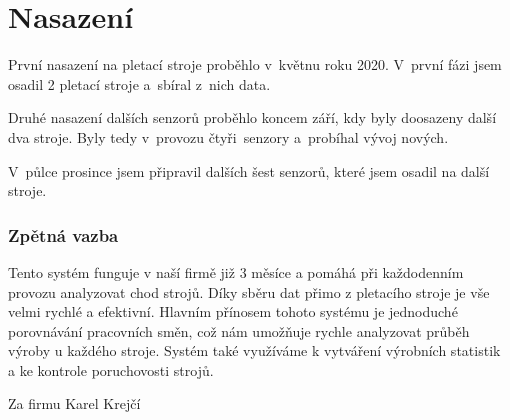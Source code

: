 \chapter{Nasazení}
První nasazení na pletací stroje proběhlo v~květnu roku 2020.
V~první fázi jsem osadil 2 pletací stroje a~sbíral z~nich data.

Druhé nasazení dalších senzorů proběhlo koncem září, kdy byly doosazeny další dva stroje.
Byly tedy v~provozu čtyři~senzory a~probíhal vývoj nových.

V~půlce prosince jsem připravil dalších šest senzorů, které jsem osadil na další stroje.


\subsection{Zpětná vazba}
\newline

Tento systém funguje v naší firmě již 3 měsíce a pomáhá při každodenním provozu analyzovat chod strojů.
Díky sběru dat přimo z pletacího stroje je vše velmi rychlé a efektivní.
Hlavním přínosem tohoto systému je jednoduché porovnávání pracovních směn, což nám umožňuje rychle analyzovat průběh výroby u každého stroje.
Systém také využíváme k vytváření výrobních statistik a ke kontrole poruchovosti strojů.

{\raggedleft Za firmu Karel Krejčí\par}



\newpage